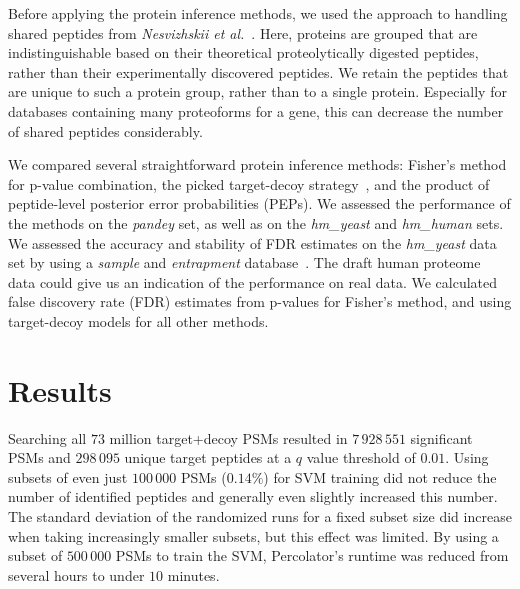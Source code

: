 \documentclass{article}
\begin{document}
Before applying the protein inference methods, we used the approach to
handling shared peptides from {\em Nesvizhskii et
al.}~\cite{nesvizhskii2003statistical}. Here, proteins are grouped
that are indistinguishable based on their theoretical proteolytically
digested peptides, rather than their experimentally discovered
peptides. We retain the peptides that are unique to such a protein
group, rather than to a single protein. Especially for databases
containing many proteoforms for a gene, this can decrease the number
of shared peptides considerably.

We compared several straightforward protein inference methods:
Fisher’s method for p-value combination, the picked target-decoy
strategy~\cite{savitski2015scalable}, and the product of peptide-level
posterior error probabilities (PEPs). We assessed the performance of
the methods on the {\em pandey} set, as well as on the {\em hm_yeast}
and {\em hm_human} sets. We assessed the accuracy and stability of FDR
estimates on the {\em hm\_yeast} data set by using a {\em sample} and
{\em entrapment} database~\cite{granholm2013determining}. The draft
human proteome data could give us an indication of the performance on
real data. We calculated false discovery rate (FDR) estimates from
p-values for Fisher’s method, and using target-decoy models for all
other methods.

\section*{Results}

Searching all $73$ million target+decoy PSMs resulted in $7\,928\,551$
significant PSMs and $298\,095$ unique target peptides at a $q$ value
threshold of $0.01$. Using subsets of even just $100\,000$ PSMs
($0.14\%$) for SVM training did not reduce the number of identified
peptides and generally even slightly increased this number. The
standard deviation of the randomized runs for a fixed subset size did
increase when taking increasingly smaller subsets, but this effect was
limited. By using a subset of $500\,000$ PSMs to train the SVM,
Percolator’s runtime was reduced from several hours to under $10$
minutes.
\end{document}
